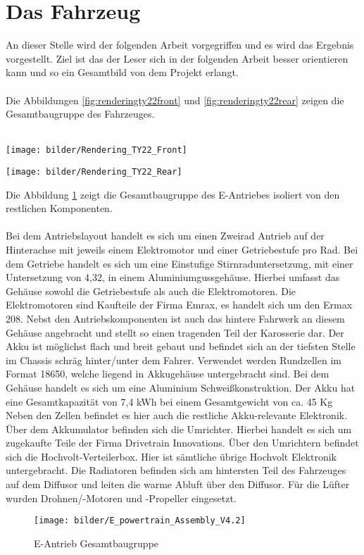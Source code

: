\section{Das Fahrzeug}
An dieser Stelle wird der folgenden Arbeit vorgegriffen und es wird das Ergebnis vorgestellt. Ziel ist das der Leser sich in der folgenden Arbeit besser orientieren kann und so ein Gesamtbild von dem Projekt erlangt.\\
\\
Die Abbildungen \ref{fig:renderingty22front} und \ref{fig:renderingty22rear} zeigen die Gesamtbaugruppe des Fahrzeuges.\\
\\
	\begin{minipage}[b]{.5\linewidth} %
			\texttt{[image: bilder/Rendering\_TY22\_Front]}
			\label{fig:renderingty22front}
	\end{minipage}
	\begin{minipage}[b]{.5\linewidth} %
			\texttt{[image: bilder/Rendering\_TY22\_Rear]}
			\label{fig:renderingty22rear}
	\end{minipage}

Die Abbildung \ref{fig:epowertrainassemblyv4} zeigt die Gesamtbaugruppe des E-Antriebes isoliert von den restlichen Komponenten.\\
\\
Bei dem Antriebslayout handelt es sich um einen Zweirad Antrieb auf der Hinterachse mit jeweils einem Elektromotor und einer Getriebestufe pro Rad. Bei dem Getriebe handelt es sich um eine Einstufige Stirnraduntersetzung, mit einer Untersetzung von 4,32, in einem Aluminiumgussgehäuse. Hierbei umfasst das Gehäuse sowohl die Getriebestufe als auch die Elektromotoren. Die Elektromotoren sind Kaufteile der Firma Emrax, es handelt sich um den Ermax 208. Nebst den Antriebskomponenten ist auch das hintere Fahrwerk an diesem Gehäuse angebracht und stellt so einen tragenden Teil der Karosserie dar. Der Akku ist möglichst flach und breit gebaut und befindet sich an der tiefsten Stelle im Chassis schräg hinter/unter dem Fahrer. Verwendet werden Rundzellen im Format 18650, welche liegend in Akkugehäuse untergebracht sind. Bei dem Gehäuse handelt es sich um eine Aluminium Schweißkonstruktion. Der Akku hat eine Gesamtkapazität von 7,4 kWh bei einem Gesamtgewicht von ca. 45 Kg Neben den Zellen befindet es hier auch die restliche Akku-relevante Elektronik. Über dem Akkumulator befinden sich die Umrichter. Hierbei handelt es sich um zugekaufte Teile der Firma Drivetrain Innovations. Über den Umrichtern befindet sich die Hochvolt-Verteilerbox. Hier ist sämtliche übrige Hochvolt Elektronik untergebracht. Die Radiatoren befinden sich am hintersten Teil des Fahrzeuges auf dem Diffusor und leiten die warme Abluft über den Diffusor. Für die Lüfter wurden Drohnen/-Motoren und -Propeller eingesetzt.

\begin{figure}
	\centering
	\texttt{[image: bilder/E\_powertrain\_Assembly\_V4.2]}
	\caption{E-Antrieb Gesamtbaugruppe}
	\label{fig:epowertrainassemblyv4}
\end{figure}

\FloatBarrier